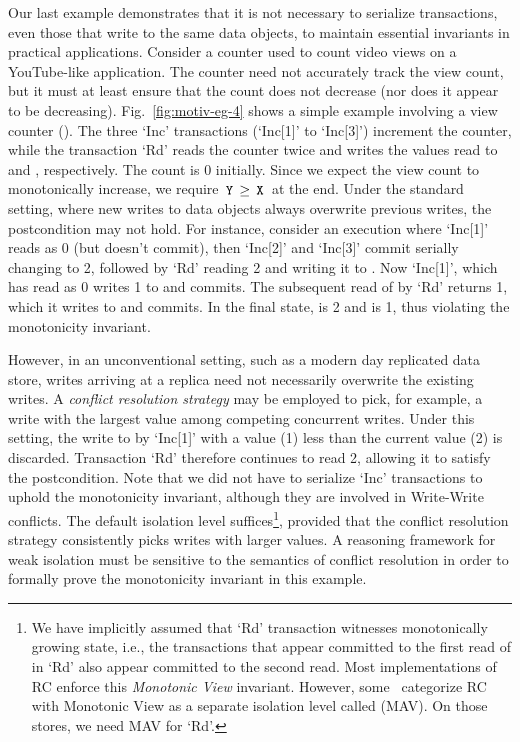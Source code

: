 Our last example demonstrates that it is not necessary to serialize
transactions, even those that write to the same data objects, to
maintain essential invariants in practical applications. Consider a
counter used to count video views on a YouTube-like application. The
counter need not accurately track the view count, but it must at least
ensure that the count does not decrease (nor does it appear to be
decreasing). Fig.~\ref{fig:motiv-eg-4} shows a simple example
involving a view counter (). The three `Inc' transactions
(`Inc[1]' to `Inc[3]') increment the counter, while the transaction
`Rd' reads the counter twice and writes the values read to  and
, respectively. The count is 0 initially. Since we expect the
view count to monotonically increase, we require $\,{\tt Y}\,\ge\,{\tt X}\,$ at
the end. Under the standard setting, where new writes to data objects
always overwrite previous writes, the postcondition may not hold. For
instance, consider an execution where `Inc[1]' reads  as 0 (but
doesn't commit), then `Inc[2]' and `Inc[3]' commit serially changing
 to 2, followed by `Rd' reading 2 and writing it to . Now
`Inc[1]', which has read  as 0 writes 1 to  and commits. The
subsequent read of  by `Rd' returns 1, which it writes to 
and commits. In the final state,  is 2 and  is 1, thus
violating the monotonicity invariant.

However, in an unconventional setting, such as a modern day replicated
data store, writes arriving at a replica need not necessarily
overwrite the existing writes. A \emph{conflict resolution strategy}
may be employed to pick, for example, a write with the largest value
among competing concurrent writes. Under this setting, the write to
 by `Inc[1]' with a value (1) less than the current value (2) is
discarded. Transaction `Rd' therefore continues to read 2, allowing it
to satisfy the postcondition. Note that we did not have to serialize
`Inc' transactions to uphold the monotonicity invariant, although they
are involved in Write-Write conflicts.  The default  isolation level suffices\footnote{We have implicitly assumed that
`Rd' transaction witnesses monotonically growing state, i.e., the
transactions that appear committed to the first read of  in `Rd'
also appear committed to the second read.  Most implementations of RC
enforce this \emph{Monotonic View} invariant. However,
some~\cite{pldi15,bailishat} categorize RC with Monotonic View as a
separate isolation level called  (MAV). On
those stores, we need MAV for `Rd'. }, provided that the conflict
resolution strategy consistently picks writes with larger values. A
reasoning framework for weak isolation must be sensitive to the
semantics of conflict resolution in order to formally prove the
monotonicity invariant in this example.

